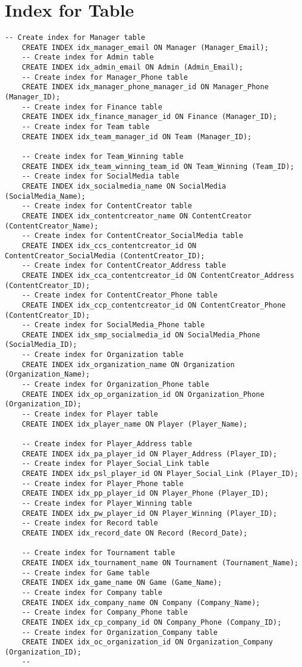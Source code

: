 \section{Index for Table}

\begin{lstlisting}[caption={Index for Table}, label={lst:index_table}]
    -- Create index for Manager table
    CREATE INDEX idx_manager_email ON Manager (Manager_Email);
    -- Create index for Admin table
    CREATE INDEX idx_admin_email ON Admin (Admin_Email);
    -- Create index for Manager_Phone table
    CREATE INDEX idx_manager_phone_manager_id ON Manager_Phone (Manager_ID);
    -- Create index for Finance table
    CREATE INDEX idx_finance_manager_id ON Finance (Manager_ID);
    -- Create index for Team table
    CREATE INDEX idx_team_manager_id ON Team (Manager_ID);
   
    -- Create index for Team_Winning table
    CREATE INDEX idx_team_winning_team_id ON Team_Winning (Team_ID);
    -- Create index for SocialMedia table
    CREATE INDEX idx_socialmedia_name ON SocialMedia (SocialMedia_Name);
    -- Create index for ContentCreator table
    CREATE INDEX idx_contentcreator_name ON ContentCreator (ContentCreator_Name);
    -- Create index for ContentCreator_SocialMedia table
    CREATE INDEX idx_ccs_contentcreator_id ON ContentCreator_SocialMedia (ContentCreator_ID);
    -- Create index for ContentCreator_Address table
    CREATE INDEX idx_cca_contentcreator_id ON ContentCreator_Address (ContentCreator_ID);
    -- Create index for ContentCreator_Phone table
    CREATE INDEX idx_ccp_contentcreator_id ON ContentCreator_Phone (ContentCreator_ID);
    -- Create index for SocialMedia_Phone table
    CREATE INDEX idx_smp_socialmedia_id ON SocialMedia_Phone (SocialMedia_ID);
    -- Create index for Organization table
    CREATE INDEX idx_organization_name ON Organization (Organization_Name);
    -- Create index for Organization_Phone table
    CREATE INDEX idx_op_organization_id ON Organization_Phone (Organization_ID);
    -- Create index for Player table
    CREATE INDEX idx_player_name ON Player (Player_Name);
   
    -- Create index for Player_Address table
    CREATE INDEX idx_pa_player_id ON Player_Address (Player_ID);
    -- Create index for Player_Social_Link table
    CREATE INDEX idx_psl_player_id ON Player_Social_Link (Player_ID);
    -- Create index for Player_Phone table
    CREATE INDEX idx_pp_player_id ON Player_Phone (Player_ID);
    -- Create index for Player_Winning table
    CREATE INDEX idx_pw_player_id ON Player_Winning (Player_ID);
    -- Create index for Record table
    CREATE INDEX idx_record_date ON Record (Record_Date);
    
    -- Create index for Tournament table
    CREATE INDEX idx_tournament_name ON Tournament (Tournament_Name);
    -- Create index for Game table
    CREATE INDEX idx_game_name ON Game (Game_Name);
    -- Create index for Company table
    CREATE INDEX idx_company_name ON Company (Company_Name);
    -- Create index for Company_Phone table
    CREATE INDEX idx_cp_company_id ON Company_Phone (Company_ID);
    -- Create index for Organization_Company table
    CREATE INDEX idx_oc_organization_id ON Organization_Company (Organization_ID);
    --
\end{lstlisting}
